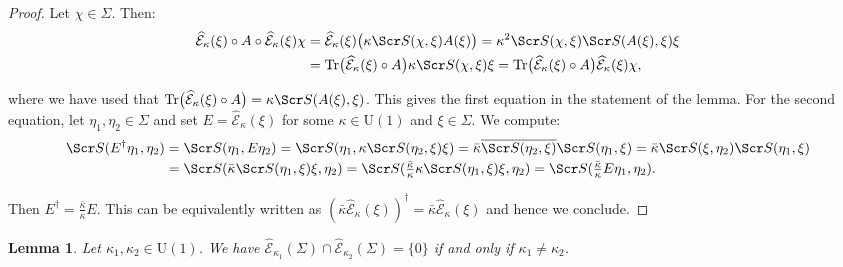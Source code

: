 \documentclass[10pt,a4paper,twoside,reqno]{amsart}
\theoremstyle{plain}
\newtheorem{lemma}[thm]{Lemma}
\theoremstyle{definition}
\theoremstyle{remark}
\newcommand{\Tr}{\mathrm{Tr}}
\def\scS{\Scr S}
\def\U{\mathrm{U}}
\def\hcE{\widehat{\mathcal{E}}}
\begin{document}
\begin{proof}
Let $\chi\in\Sigma$. Then: 
\begin{align*}
\hcE_\kappa(\xi)\circ A \circ \hcE_\kappa(\xi) \chi &= \hcE_\kappa(\xi)\big(\kappa\scS(\chi,\xi) A(\xi) \big) = \kappa^2 \scS(\chi,\xi)\scS(A(\xi),\xi)\xi\\
&=\Tr\big(\hcE_\kappa(\xi) \circ A\big)\kappa\scS(\chi,\xi)\xi=\Tr\big(\hcE_\kappa(\xi) \circ A \big)\hcE_\kappa(\xi)\chi,
\end{align*}

\noindent
where we have used that $\Tr\big(\hcE_\kappa(\xi) \circ A\big)=\kappa\scS(A(\xi),\xi)$. This gives the first equation in the statement of the lemma. For the second equation, let $\eta_1 , \eta_2\in\Sigma$ and set $E=\hcE_\kappa(\xi)$ for some $\kappa\in\U(1)$ and $\xi\in\Sigma$. We compute: 
\begin{align*}
\scS(E^\dagger \eta_1,\eta_2) & = \scS(\eta_1,E\eta_2) = \scS(\eta_1,\kappa\scS(\eta_2,\xi)\xi) = \bar{\kappa} \overline{\scS(\eta_2,\xi)} \scS(\eta_1,\xi) = \bar{\kappa} \scS(\xi,\eta_2)\scS(\eta_1,\xi)\\
&=\scS(\bar{\kappa} \scS(\eta_1,\xi)\xi,\eta_2)=\scS(\tfrac{\bar\kappa}{\kappa} \kappa \scS(\eta_1,\xi)\xi,\eta_2) = \scS(\tfrac{\bar\kappa}{\kappa}E\eta_1,\eta_2).
\end{align*}

\noindent
Then $E^\dagger=\frac{\bar\kappa}{\kappa}E$. This can be equivalently written as $(\bar\kappa \hcE_\kappa(\xi))^\dagger = \bar\kappa \hcE_\kappa(\xi)$ and hence we conclude.
\end{proof}

\begin{lemma}
\label{lemma:Z=calE(Sigma)}
Let $\kappa_1 , \kappa_2 \in \U(1)$. We have $\hcE_{\kappa_1}(\Sigma)\cap \hcE_{\kappa_2}(\Sigma)=\{0\}$ if and only if $\kappa_1\neq\kappa_2$. 
\end{lemma}
\end{document}
